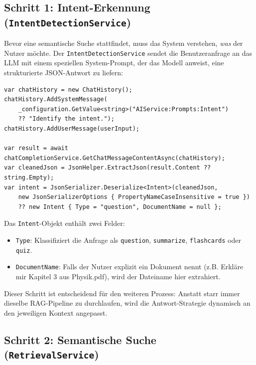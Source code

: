 \subsection{Schritt 1: Intent-Erkennung (\texttt{IntentDetectionService})}
\label{subsec:intent}

Bevor eine semantische Suche stattfindet, muss das System verstehen, \textit{was} der Nutzer m\"ochte. Der \texttt{IntentDetectionService} sendet die Benutzeranfrage an das LLM mit einem speziellen System-Prompt, der das Modell anweist, eine strukturierte JSON-Antwort zu liefern:

\begin{lstlisting}[language={[Sharp]C}, caption={Intent-Erkennung via LLM in IntentDetectionService.cs}]
var chatHistory = new ChatHistory();
chatHistory.AddSystemMessage(
    _configuration.GetValue<string>("AIService:Prompts:Intent")
    ?? "Identify the intent.");
chatHistory.AddUserMessage(userInput);

var result = await chatCompletionService.GetChatMessageContentAsync(chatHistory);
var cleanedJson = JsonHelper.ExtractJson(result.Content ?? string.Empty);
var intent = JsonSerializer.Deserialize<Intent>(cleanedJson,
    new JsonSerializerOptions { PropertyNameCaseInsensitive = true })
    ?? new Intent { Type = "question", DocumentName = null };
\end{lstlisting}

Das \texttt{Intent}-Objekt enth\"alt zwei Felder:
\begin{itemize}
    \item \texttt{Type}: Klassifiziert die Anfrage als \texttt{\dq{}question\dq{}}, \texttt{\dq{}summarize\dq{}}, \texttt{\dq{}flashcards\dq{}} oder \texttt{\dq{}quiz\dq{}}.
    \item \texttt{DocumentName}: Falls der Nutzer explizit ein Dokument nennt (z.B. \glqq{}Erkl\"are mir Kapitel 3 aus Physik.pdf\grqq{}), wird der Dateiname hier extrahiert.
\end{itemize}

Dieser Schritt ist entscheidend für den weiteren Prozess: Anstatt starr immer dieselbe RAG-Pipeline zu durchlaufen, wird die Antwort-Strategie dynamisch an den jeweiligen Kontext angepasst.

\subsection{Schritt 2: Semantische Suche (\texttt{RetrievalService})}
\label{subsec:retrieval}

